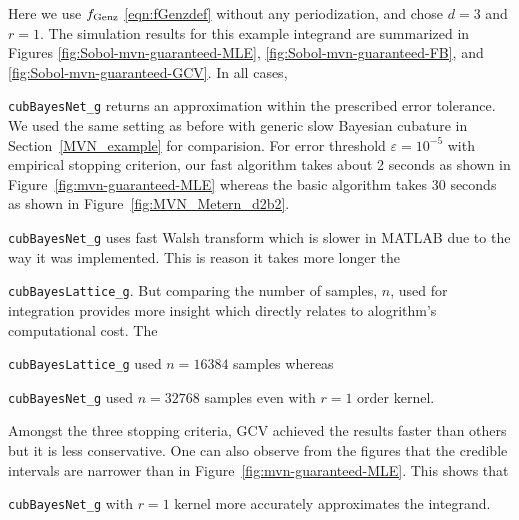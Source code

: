 \documentclass{svjour3}                     %
\newcommand{\code}[1]{\texttt{#1}}
\newcommand\figref{Figure~\ref}
\newcommand\secref{Section~\ref}
\begin{document}
Here we use $ f_{\textup{Genz}}$ \eqref{eqn:fGenzdef} without any periodization, and chose $d=3$ and $r=1$. The simulation results for this example integrand are summarized in Figures \ref{fig:Sobol-mvn-guaranteed-MLE}, \ref{fig:Sobol-mvn-guaranteed-FB}, and \ref{fig:Sobol-mvn-guaranteed-GCV}.  In all cases, {\code{cubBayesNet\_g} returns an approximation within the prescribed error tolerance. We used the same setting as before with generic slow Bayesian cubature in \secref{MVN_example} for comparision. For error threshold $\varepsilon=10^{-5}$ with empirical stopping criterion, our fast algorithm takes about 2 seconds as shown in \figref{fig:mvn-guaranteed-MLE} whereas the basic algorithm takes 30 seconds as shown in \figref{fig:MVN_Metern_d2b2}. 
{\code{cubBayesNet\_g} uses fast Walsh transform which is slower in MATLAB due to the way it was implemented. This is reason it takes more longer the {\code{cubBayesLattice\_g}. 
But comparing the number of samples, $n$, used for integration provides more insight which directly relates to alogrithm's computational cost. The {\code{cubBayesLattice\_g} used $n=16384$ samples whereas {\code{cubBayesNet\_g} used $n=32768$ samples even with $r=1$ order kernel.

Amongst the three stopping criteria, GCV achieved the results faster than others but it is less conservative. 
One can also observe from the figures that the credible intervals are narrower than in \figref{fig:mvn-guaranteed-MLE}.
This shows that {\code{cubBayesNet\_g} with $r=1$ kernel more accurately approximates the integrand.

}}}}}}
\end{document}
